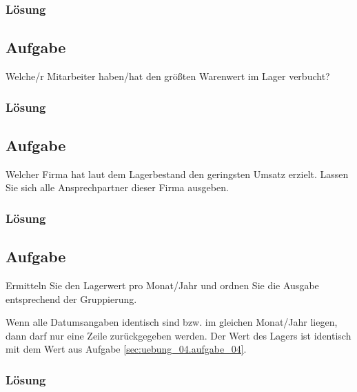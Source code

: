 \subsubsection*{Lösung}
\label{sec:uebung_04.aufgabe_06.loesung}

\subsection{Aufgabe}
\label{sec:uebung_04.aufgabe_07}
Welche/r Mitarbeiter haben/hat den größten Warenwert im Lager verbucht?

\subsubsection*{Lösung}
\label{sec:uebung_04.aufgabe_07.loesung}

\subsection{Aufgabe}
\label{sec:uebung_04.aufgabe_08}
Welcher Firma hat laut dem Lagerbestand den geringsten Umsatz erzielt. Lassen Sie sich alle Ansprechpartner dieser Firma ausgeben.

\subsubsection*{Lösung}
\label{sec:uebung_04.aufgabe_08.loesung}

\subsection{Aufgabe}
\label{sec:uebung_04.aufgabe_09}
Ermitteln Sie den Lagerwert pro Monat/Jahr und ordnen Sie die Ausgabe entsprechend der Gruppierung.

\begin{info-popup}
  Wenn alle Datumsangaben identisch sind bzw. im gleichen Monat/Jahr liegen, dann darf nur eine Zeile zurückgegeben werden. Der Wert des Lagers ist identisch mit dem Wert aus Aufgabe \ref{sec:uebung_04.aufgabe_04}.
\end{info-popup}

\subsubsection*{Lösung}
\label{sec:uebung_04.aufgabe_09.loesung}

